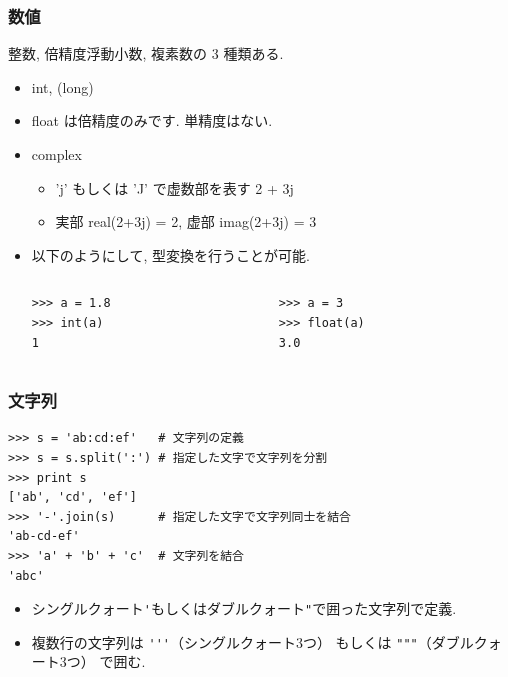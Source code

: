 \begin{frame}[t,fragile]
\frametitle{数値}

整数, 倍精度浮動小数, 複素数の 3 種類ある. 

\begin{itemize}
 \item int, (long)
 \item float は倍精度のみです. 単精度はない. 
 \item complex
       \begin{itemize}
	\item 'j' もしくは 'J' で虚数部を表す 2 + 3j
	\item 実部 real(2+3j) = 2, 虚部 imag(2+3j) = 3  
       \end{itemize}
 \item 以下のようにして, 型変換を行うことが可能. 

       \begin{columns}
	\begin{column}{4cm}
\begin{lstlisting}
>>> a = 1.8
>>> int(a)
1
\end{lstlisting}	 
	\end{column}
	\begin{column}{4cm}
\begin{lstlisting}
>>> a = 3
>>> float(a)
3.0
\end{lstlisting}	 
	\end{column}
       \end{columns}
\end{itemize}

\end{frame}

\begin{frame}[t,fragile]
\frametitle{文字列}

\begin{lstlisting}
>>> s = 'ab:cd:ef'   # 文字列の定義
>>> s = s.split(':') # 指定した文字で文字列を分割
>>> print s
['ab', 'cd', 'ef']
>>> '-'.join(s)      # 指定した文字で文字列同士を結合
'ab-cd-ef'
>>> 'a' + 'b' + 'c'  # 文字列を結合
'abc'
\end{lstlisting}

\begin{itemize}
  \item シングルクォート\verb|'|もしくはダブルクォート\verb|"|で囲った文字列で定義. 
  \item 複数行の文字列は \verb|'''|（シングルクォート3つ） もしくは \verb|"""|（ダブルクォート3つ） で囲む.
\end{itemize}
\end{frame}

